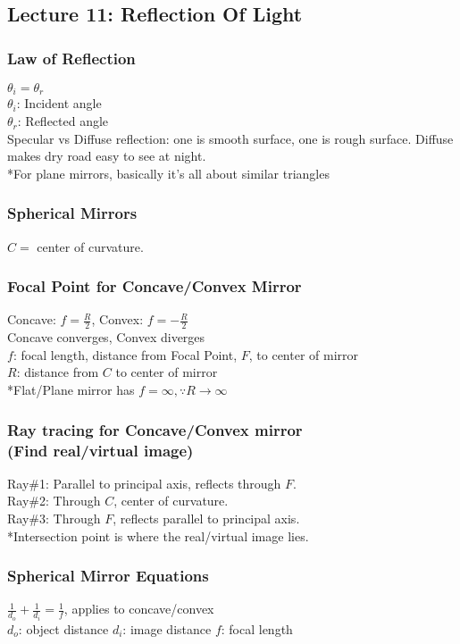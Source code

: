 \documentclass[10 pt]{article}
\begin{document}
\begin{multicols}{2}
\subsection*{Lecture 11: Reflection Of Light}
\subsubsection*{Law of Reflection}
$\theta_{i} = \theta_{r}$ \\
$\theta_{i}$: Incident angle \\
$\theta_{r}$: Reflected angle \\
Specular vs Diffuse reflection: one is smooth surface, one is rough surface. Diffuse makes dry road easy to see at night. \\
*For plane mirrors, basically it's all about similar triangles
\subsubsection*{Spherical Mirrors}
$C = $ center of curvature.
\subsubsection*{Focal Point for Concave/Convex Mirror}
Concave: $f = \frac{R}{2}$, Convex: $f=-\frac{R}{2}$  \\
Concave converges, Convex diverges \\
$f$: focal length, distance from Focal Point, $F$, to center of mirror \\
$R$: distance from $C$ to center of mirror \\
*Flat/Plane mirror has $f = \infty, \because R\rightarrow \infty$
\subsubsection*{Ray tracing for Concave/Convex mirror \\(Find real/virtual image)}
Ray\#1: Parallel to principal axis, reflects through $F$. \\
Ray\#2: Through $C$, center of curvature. \\
Ray\#3: Through $F$, reflects parallel to principal axis. \\
*Intersection point is where the real/virtual image lies.
\subsubsection*{Spherical Mirror Equations}
$\frac{1}{d_{o}} + \frac{1}{d_{i}} = \frac{1}{f}$, applies to concave/convex \\
$d_{o}$: object distance
$d_{i}$: image distance
$f$: focal length

\end{multicols}
\end{document}

